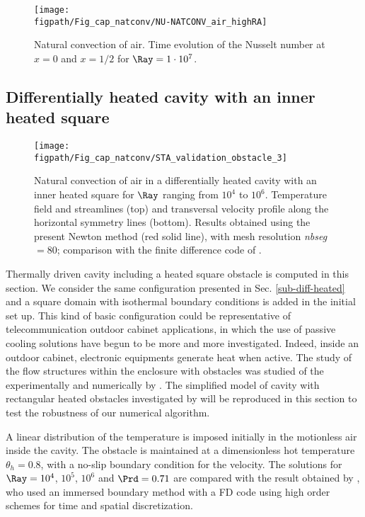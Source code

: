 \begin{figure}[!ht]
	\begin{center}
		\texttt{[image: \\figpath/Fig\_cap\_natconv/NU-NATCONV\_air\_highRA]} 
	\end{center}
	\caption{Natural convection of air. Time evolution of the Nusselt number at $x=0$ and $x=1/2$ for $\Ray = 1 \cdot 10^7$.}
	\label{fig-natconv-NU-highRa}
\end{figure}

\subsection{Differentially heated cavity with an inner heated square} \label{sub-2D-OBSTACLE}

\begin{figure}
	\begin{center}
		\texttt{[image: \\figpath/Fig\_cap\_natconv/STA\_validation\_obstacle\_3]} 
	\end{center}
	\caption{Natural convection of air in a differentially heated cavity with an inner heated square for $\Ray$ ranging from $10^4$ to $10^6$. Temperature field and streamlines (top) and transversal velocity profile along the  horizontal symmetry lines (bottom). Results obtained using the present Newton method (red solid line), with mesh resolution {\em nbseg} $=80$; comparison with the finite difference code of \cite{Raluca2013}.}
	\label{fig-obst-2D}
\end{figure}

Thermally driven cavity including a heated square obstacle is computed in this section.
We consider the same configuration presented in Sec. \ref{sub-diff-heated} and a square domain with isothermal boundary conditions is added in the initial set up.
This kind of basic configuration could be representative of telecommunication outdoor cabinet applications, in which the use of passive cooling solutions have begun to be more and more investigated.
Indeed, inside an outdoor cabinet, electronic equipments generate heat when active. 
The study of the flow structures within the enclosure with obstacles was studied of the experimentally and numerically by \cite{Raluca2013}.
The simplified model of cavity with rectangular heated obstacles investigated by \cite{Raluca2013} will be reproduced in this section to test the robustness of our numerical algorithm.

A linear distribution of the temperature is imposed initially in the motionless air inside the cavity.
The obstacle is maintained at a dimensionless hot temperature $\theta_h = 0.8$, with a no-slip boundary condition for the velocity.
The solutions for $\Ray= 10^4$, $10^5$, $10^6$ and $\Prd = 0.71$ are compared with the result obtained by \cite{Raluca2013}, who used an immersed boundary method with a FD code using high order schemes for time and spatial discretization.

